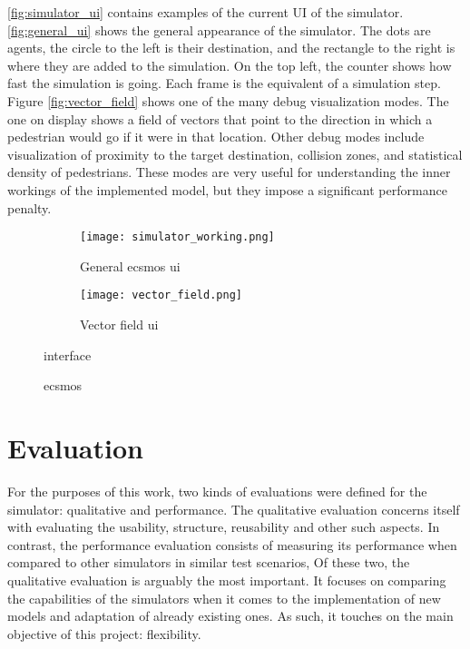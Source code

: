 \documentclass[twoside, 11pt]{article}
\begin{document}
\autoref{fig:simulator_ui} contains examples of the current UI of the simulator. \autoref{fig:general_ui} shows the general appearance of the simulator. The dots are agents, the circle to the left is their destination, and the rectangle to the right is where they are added to the simulation. On the top left, the counter shows how fast the simulation is going. Each frame is the equivalent of a simulation step. Figure \autoref{fig:vector_field} shows one of the many debug visualization modes. The one on display shows a field of vectors that point to the direction in which a pedestrian would go if it were in that location. Other debug modes include visualization of proximity to the target destination, collision zones, and statistical density of pedestrians. These modes are very useful for understanding the inner workings of the implemented model, but they impose a significant performance penalty.

\begin{figure}[h]
  \centering
  \begin{subfigure}{.5\textwidth}
    \centering
    \texttt{[image: simulator\_working.png]}
    \caption{General \gls{ecsmos} \gls{ui}}
    \label{fig:general_ui}
  \end{subfigure}%
  \begin{subfigure}{.5\textwidth}
    \centering
    \texttt{[image: vector\_field.png]}
    \caption{Vector field \gls{ui}}
    \label{fig:vector_field}
  \end{subfigure}%
  \caption{\gls{ecsmos}} interface
  \label{fig:simulator_ui}
\end{figure}

\section{Evaluation} \label{sec:evaluation}

For the purposes of this work, two kinds of evaluations were defined for the simulator: qualitative and performance. The qualitative evaluation concerns itself with evaluating the usability, structure, reusability and other such aspects. In contrast, the performance evaluation consists of measuring its performance when compared to other simulators in similar test scenarios,  Of these two, the qualitative evaluation is arguably the most important. It focuses on comparing the capabilities of the simulators when it comes to the implementation of new models and adaptation of already existing ones. As such, it touches on the main objective of this project: flexibility. 
\end{document}

